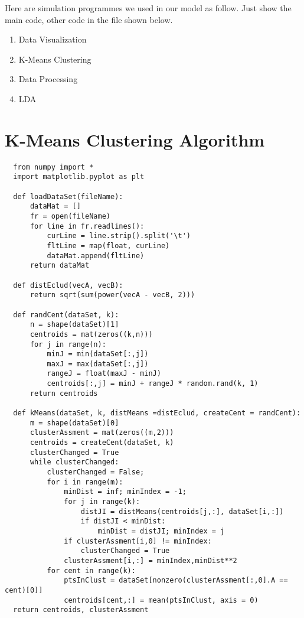 \documentclass[12pt]{article}
\begin{document}
	\begin{appendices}
    Here are simulation programmes we used in our model as follow. Just show the main code, other code in the file shown below.
    \begin{enumerate}[topsep=0pt]
        \item Data Visualization 
        \item K-Means Clustering 
        \item Data Processing 
        \item LDA 
    \end{enumerate}
		\section{K-Means Clustering Algorithm}
        \begin{verbatim}
  from numpy import *
  import matplotlib.pyplot as plt

  def loadDataSet(fileName):  
      dataMat = []              
      fr = open(fileName)
      for line in fr.readlines():
          curLine = line.strip().split('\t')
          fltLine = map(float, curLine) 
          dataMat.append(fltLine)
      return dataMat

  def distEclud(vecA, vecB):
      return sqrt(sum(power(vecA - vecB, 2)))

  def randCent(dataSet, k):
      n = shape(dataSet)[1]
      centroids = mat(zeros((k,n)))   
      for j in range(n):
          minJ = min(dataSet[:,j])
          maxJ = max(dataSet[:,j])
          rangeJ = float(maxJ - minJ)
          centroids[:,j] = minJ + rangeJ * random.rand(k, 1)
      return centroids

  def kMeans(dataSet, k, distMeans =distEclud, createCent = randCent):
      m = shape(dataSet)[0]  
      clusterAssment = mat(zeros((m,2)))
      centroids = createCent(dataSet, k)
      clusterChanged = True   
      while clusterChanged:
          clusterChanged = False;
          for i in range(m): 
              minDist = inf; minIndex = -1;
              for j in range(k):
                  distJI = distMeans(centroids[j,:], dataSet[i,:])
                  if distJI < minDist:
                      minDist = distJI; minIndex = j 
              if clusterAssment[i,0] != minIndex:
                  clusterChanged = True  
              clusterAssment[i,:] = minIndex,minDist**2   
          for cent in range(k):   
              ptsInClust = dataSet[nonzero(clusterAssment[:,0].A == cent)[0]]   
              centroids[cent,:] = mean(ptsInClust, axis = 0)  
  return centroids, clusterAssment
          \end{verbatim}

\end{appendices}
\end{document}
